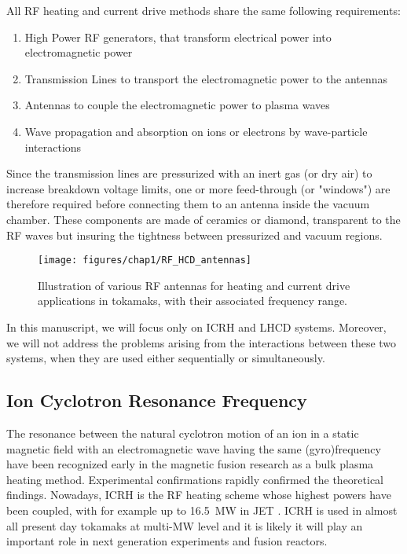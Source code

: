 All RF heating and current drive methods share the same following requirements:
\begin{enumerate}
	\item High Power RF generators, that transform electrical power into electromagnetic power
	\item Transmission Lines to transport the electromagnetic power to the antennas
	\item Antennas to couple the electromagnetic power to plasma waves
	\item Wave propagation and absorption on ions or electrons by wave-particle interactions
\end{enumerate}

Since the transmission lines are pressurized with an inert gas (or dry air) to increase breakdown voltage limits, one or more feed-through (or "windows") are therefore required before connecting them to an antenna inside the vacuum chamber. These components are made of ceramics or diamond, transparent to the RF waves but insuring the tightness between pressurized and vacuum regions. 

\begin{figure}[h]
	\centering
	\texttt{[image: figures/chap1/RF\_HCD\_antennas]}
	\caption{Illustration of various RF antennas for heating and current drive applications in tokamaks, with their associated frequency range.}
	\label{fig:rfhcdantennas}
\end{figure}


In this manuscript, we will focus only on ICRH and LHCD systems. Moreover, we will not address the problems arising from the interactions between these two systems, when they are used either sequentially or simultaneously.



\subsection{Ion Cyclotron Resonance Frequency}
The resonance between the natural cyclotron motion of an ion in a static magnetic field with an electromagnetic wave having the same (gyro)frequency have been recognized early in the magnetic fusion research as a bulk plasma heating method. Experimental confirmations rapidly confirmed the theoretical findings. Nowadays, ICRH is the RF heating scheme whose highest powers have been coupled, with for example up to 16.5~\si{MW} in JET . ICRH is used in almost all present day tokamaks at multi-\si{MW} level and it is likely it will  play an important role in next generation experiments and fusion reactors.

